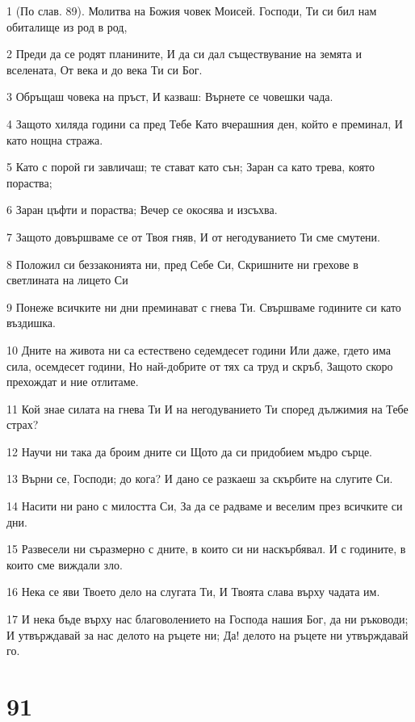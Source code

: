 \par 1 (По слав. 89). Молитва на Божия човек Моисей. Господи, Ти си бил нам обиталище из род в род,
\par 2 Преди да се родят планините, И да си дал съществувание на земята и вселената, От века и до века Ти си Бог.
\par 3 Обръщаш човека на пръст, И казваш: Върнете се човешки чада.
\par 4 Защото хиляда години са пред Тебе Като вчерашния ден, който е преминал, И като нощна стража.
\par 5 Като с порой ги завличаш; те стават като сън; Заран са като трева, която пораства;
\par 6 Заран цъфти и пораства; Вечер се окосява и изсъхва.
\par 7 Защото довършваме се от Твоя гняв, И от негодуванието Ти сме смутени.
\par 8 Положил си беззаконията ни, пред Себе Си, Скришните ни грехове в светлината на лицето Си
\par 9 Понеже всичките ни дни преминават с гнева Ти. Свършваме годините си като въздишка.
\par 10 Дните на живота ни са естествено седемдесет години Или даже, гдето има сила, осемдесет години, Но най-добрите от тях са труд и скръб, Защото скоро прехождат и ние отлитаме.
\par 11 Кой знае силата на гнева Ти И на негодуванието Ти според дължимия на Тебе страх?
\par 12 Научи ни така да броим дните си Щото да си придобием мъдро сърце.
\par 13 Върни се, Господи; до кога? И дано се разкаеш за скърбите на слугите Си.
\par 14 Насити ни рано с милостта Си, За да се радваме и веселим през всичките си дни.
\par 15 Развесели ни съразмерно с дните, в които си ни наскърбявал. И с годините, в които сме виждали зло.
\par 16 Нека се яви Твоето дело на слугата Ти, И Твоята слава върху чадата им.
\par 17 И нека бъде върху нас благоволението на Господа нашия Бог, да ни ръководи; И утвърждавай за нас делото на ръцете ни; Да! делото на ръцете ни утвърждавай го.

\chapter{91}

